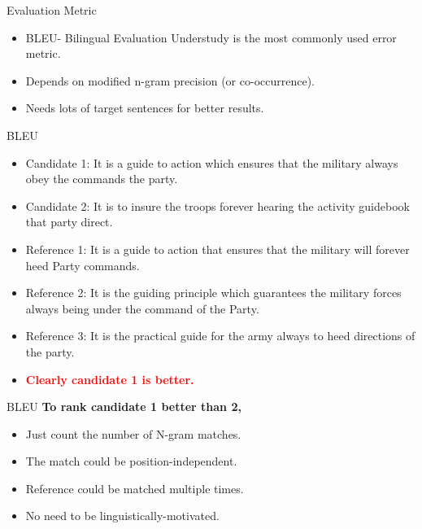 ﻿\documentclass[table,aspectratio=43,mathserif,xcolor={usenames,dvipsnames,svgnames,table},10pt]{beamer}
\begin{document}
\begin{frame}{Evaluation Metric}
\begin{itemize}
 \item<+-> BLEU- Bilingual Evaluation Understudy is the most commonly used error metric.
 \item<+-> Depends on modified n-gram precision (or co-occurrence).
 \item<+-> Needs lots of target sentences for better results.
 \end{itemize}
\end{frame}

\begin{frame}{BLEU}

\begin{itemize}
\item Candidate 1: It is a guide to action which ensures that the military always obey the commands the party.
\item Candidate 2: It is to insure the troops forever hearing the activity guidebook that party direct.

\item<+-> Reference 1: It is a guide to action that ensures that the military will forever heed Party commands. 
\item<+-> Reference 2: It is the guiding principle which guarantees the military forces always being under the command of the Party.
\item<+-> Reference 3: It is the practical guide for the army always to heed directions of the party.

\item<+-> \textbf{ \textcolor{red}{Clearly candidate 1 is better.}}
\end{itemize}
\end{frame}

\begin{frame}{BLEU}
\textbf{To rank candidate 1 better than 2,}
\begin{itemize}
\item<+-> Just count the number of N-gram matches.
\item<+-> The match could be position-independent.
\item<+-> Reference could be matched multiple times.
\item<+-> No need to be linguistically-motivated.
\end{itemize}
\end{frame}
\end{document}
